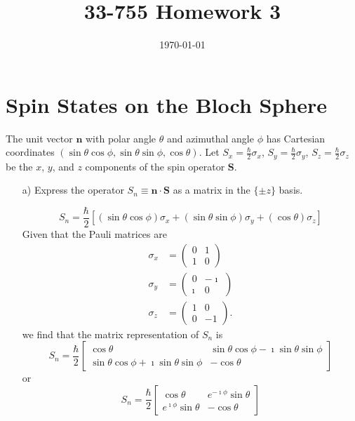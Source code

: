\documentclass[a4paper,twoside]{article}
\title{33-755 Homework 3}
\date{\today}
\begin{document}
\maketitle
\section{Spin States on the Bloch Sphere}%
\label{sec:spin_states_on_the_bloch_sphere}

The unit vector $\mathbf{n}$ with polar angle $\theta$ and azimuthal angle $\phi$ has Cartesian coordinates $(\sin\theta\cos\phi,\sin\theta\sin\phi,\cos\theta)$. Let $S_x = \frac{\hbar}{2}\sigma_x$, $S_y = \frac{\hbar}{2}\sigma_y$, $S_z = \frac{\hbar}{2}\sigma_z$ be the $x$, $y$, and $z$ components of the spin operator $\mathbf{S}$.
\begin{itemize}
    \item[a)] Express the operator $S_n\equiv\mathbf{n}\cdot \mathbf{S}$ as a matrix in the $\{\pm z\} $ basis.

\begin{tcolorbox}
    \begin{equation}
        S_n = \frac{\hbar}{2}\left[(\sin\theta\cos\phi)\sigma_x + (\sin\theta\sin\phi)\sigma_y + (\cos\theta)\sigma_z  \right]
    \end{equation}
    Given that the Pauli matrices are
    \begin{align*}
        \sigma_x &= \begin{pmatrix} 0&1\\1&0 \end{pmatrix}\\
        \sigma_y &= \begin{pmatrix} 0&-\imath\\ \imath&0 \end{pmatrix}\\
        \sigma_z &= \begin{pmatrix} 1&0\\0&-1 \end{pmatrix} 
    .\end{align*}
    we find that the matrix representation of $S_n$ is
    \begin{equation}
        S_n = \frac{\hbar}{2}\begin{bmatrix} \cos\theta & \sin\theta\cos\phi -\imath\sin\theta\sin\phi \\ \sin\theta\cos\phi + \imath\sin\theta\sin\phi & -\cos\theta  \end{bmatrix}
    \end{equation}
    or
    \begin{equation}
        S_n = \frac{\hbar}{2}\begin{bmatrix} \cos\theta & e^{-\imath\phi}\sin\theta \\ e^{\imath\phi}\sin\theta & -\cos\theta \end{bmatrix}  
    \end{equation}
\end{tcolorbox}


\end{itemize}
\end{document}
